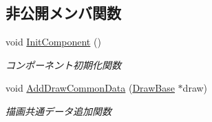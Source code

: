 \subsection*{非公開メンバ関数}
\begin{DoxyCompactItemize}
\item 
void \mbox{\hyperlink{class_game_object_base_a5f4d4e3d23603d8e32ddb220a53039a6}{Init\+Component}} ()
\begin{DoxyCompactList}\small\item\em コンポーネント初期化関数 \end{DoxyCompactList}\item 
void \mbox{\hyperlink{class_game_object_base_a105d9f213369929ecf934711a20e91d5}{Add\+Draw\+Common\+Data}} (\mbox{\hyperlink{class_draw_base}{Draw\+Base}} $\ast$draw)
\begin{DoxyCompactList}\small\item\em 描画共通データ追加関数 \end{DoxyCompactList}\end{DoxyCompactItemize}

